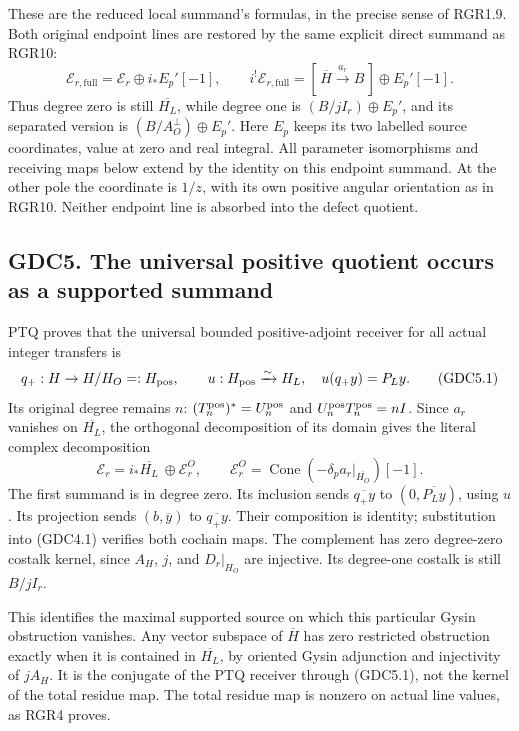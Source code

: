 These are the reduced local summand's formulas, in the precise sense of
RGR1.9. Both original endpoint lines are restored by the same explicit
direct summand as RGR10: \[
\mathscr E_{r,\mathrm{full}}=\mathscr E_r\oplus i_*E_p'[-1],
\qquad
i^!\mathscr E_{r,\mathrm{full}}
=[\,\overline H\xrightarrow{a_r}B\,]\oplus E_p'[-1].
\tag{GDC4.7}
\] Thus degree zero is still \(\overline{H_L}\), while degree one is
\((B/jI_r)\oplus E_p'\), and its separated version is
\((B/A_O^\perp)\oplus E_p'\). Here \(E_p\) keeps its two labelled source
coordinates, value at zero and real integral. All parameter isomorphisms
and receiving maps below extend by the identity on this endpoint
summand. At the other pole the coordinate is \(1/z\), with its own
positive angular orientation as in RGR10. Neither endpoint line is
absorbed into the defect quotient.

\subsection{GDC5. The universal positive quotient occurs as a supported
summand}\label{gdc5.-the-universal-positive-quotient-occurs-as-a-supported-summand}

PTQ proves that the universal bounded positive-adjoint receiver for all
actual integer transfers is \[
q_+:H\to H/H_O=:H_{\rm pos},\qquad
u:H_{\rm pos}\xrightarrow{\sim}H_L,\quad u(q_+y)=P_Ly.
\tag{GDC5.1}
\] Its original degree remains \(n\):
\((T_n^{\rm pos})^*=U_n^{\rm pos}\) and
\(U_n^{\rm pos}T_n^{\rm pos}=nI\). Since \(a_r\) vanishes on
\(\overline{H_L}\), the orthogonal decomposition of its domain gives the
literal complex decomposition \[
\boxed{\mathscr E_r=i_*\overline{H_L}\ \oplus
\mathscr E_r^O,\qquad
\mathscr E_r^O=\operatorname{Cone}(-\delta_pa_r|_{\overline{H_O}})[-1].}
\tag{GDC5.2}
\] The first summand is in degree zero. Its inclusion sends
\(\overline{q_+y}\) to \((0,\overline{P_Ly})\), using \(u\). Its
projection sends \((b,\overline y)\) to \(\overline{q_+y}\). Their
composition is identity; substitution into (GDC4.1) verifies both
cochain maps. The complement has zero degree-zero costalk kernel, since
\(A_H\), \(j\), and \(D_r|_{H_O}\) are injective. Its degree-one costalk
is still \(B/jI_r\).

This identifies the maximal supported source on which this particular
Gysin obstruction vanishes. Any vector subspace of \(\overline H\) has
zero restricted obstruction exactly when it is contained in
\(\overline{H_L}\), by oriented Gysin adjunction and injectivity of
\(jA_H\). It is the conjugate of the PTQ receiver through (GDC5.1), not
the kernel of the total residue map. The total residue map is nonzero on
actual line values, as RGR4 proves.

